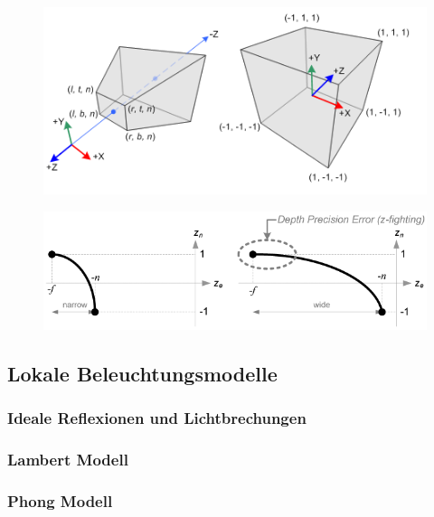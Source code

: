 \begin{Algorithmus}
\end{Algorithmus}


\begin{figure}[H]
    \centering
    \includegraphics[width=1.0\textwidth]{images/gl_projectionmatrix01.png}
\end{figure}

\begin{figure}[H]
    \centering
    \includegraphics[width=1.0\textwidth]{images/gl_projectionmatrix_zbuffer_1.png}
\end{figure}



\subsection{Lokale Beleuchtungsmodelle}
\subsubsection{Ideale Reflexionen und Lichtbrechungen}
\subsubsection{Lambert  Modell}
\subsubsection{Phong Modell}

